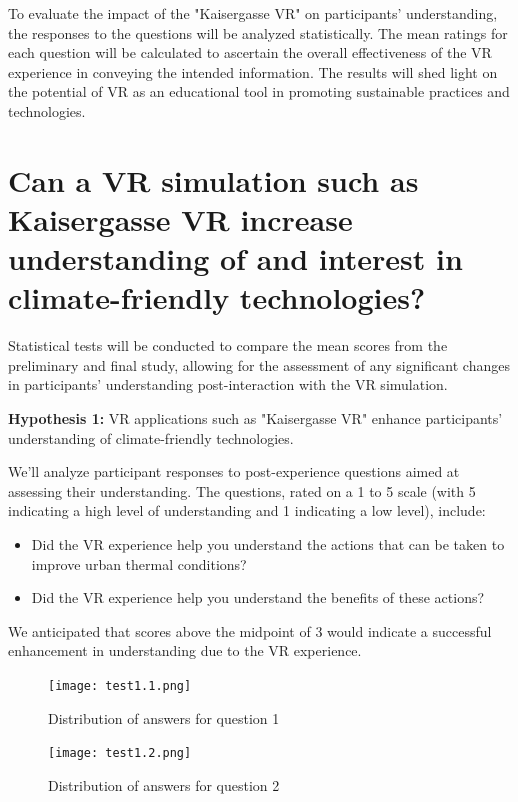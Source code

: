 \documentclass[draft, final]{vutinfth} %
\begin{document}
To evaluate the impact of the "Kaisergasse VR" on participants' understanding, the responses to the questions will be analyzed statistically. The mean ratings for each question will be calculated to ascertain the overall effectiveness of the VR experience in conveying the intended information. The results will shed light on the potential of VR as an educational tool in promoting sustainable practices and technologies.

\section{Can a VR simulation such as Kaisergasse VR increase understanding of and interest in climate-friendly technologies?}
Statistical tests will be conducted to compare the mean scores from the preliminary and final study, allowing for the assessment of any significant changes in participants' understanding post-interaction with the VR simulation.

\textbf{Hypothesis 1:} VR applications such as "Kaisergasse VR" enhance participants' understanding of climate-friendly technologies.

We'll analyze participant responses to post-experience questions aimed at assessing their understanding. The questions, rated on a 1 to 5 scale (with 5 indicating a high level of understanding and 1 indicating a low level), include:
\begin{itemize}
    \item Did the VR experience help you understand the actions that can be taken to improve urban thermal conditions?
    \item Did the VR experience help you understand the benefits of these actions?
\end{itemize}
We anticipated that scores above the midpoint of 3 would indicate a successful enhancement in understanding due to the VR experience.

\begin{figure}[h]
  \centering
  \texttt{[image: test1.1.png]}
  \caption[Distribution of answers for question 1.1]{Distribution of answers for question 1}
  \label{fig:analysis-image1}
\end{figure}

\begin{figure}[h]
  \centering
  \texttt{[image: test1.2.png]}
  \caption[Distribution of answers for question 1.2]{Distribution of answers for question 2}
  \label{fig:analysis-image2}
\end{figure}
\end{document}
